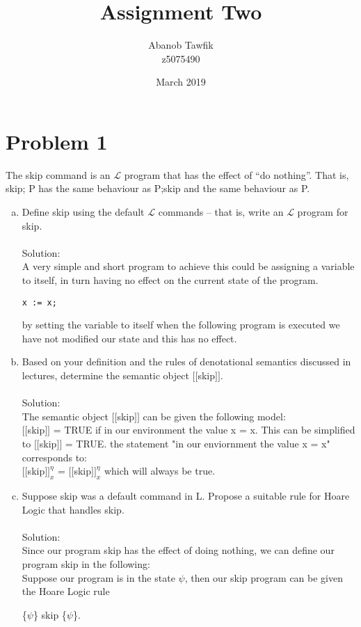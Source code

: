 \documentclass{article}
\title{Assignment Two}
\author{Abanob Tawfik\\z5075490}
\date{March 2019}
\newcommand*\moveToRight[1]{\hspace*{0em plus 1fill}\makebox{(#1)}}
\begin{document}
\maketitle
\section{Problem 1}
The skip command is an $\mathcal{L}$  program that has the effect of “do nothing”. That is, skip; P has the same behaviour as P;skip and the same behaviour as P.
\begin{enumerate}[(a)]
    \item Define skip using the default $\mathcal{L}$ commands – that is, write an $\mathcal{L}$ program for skip. \moveToRight{3 marks}\\\\
    Solution: \\
    A very simple and short program to achieve this could be assigning a variable to itself, in turn having no effect on the current state of the program.
    \begin{lstlisting}[language=Maple,mathescape=true]
x := x;
    \end{lstlisting}
    by setting the variable to itself when the following program is executed we have not modified our state and this has no effect. 
    
    \item Based on your definition and the rules of denotational semantics discussed in lectures, determine the semantic object $[\![$skip$]\!]$. \moveToRight{4 marks}\\\\
    Solution: \\
    The semantic object $[\![$skip$]\!]$ can be given the following model:\\
    $[\![$skip$]\!]$ = TRUE if in our environment the value x = x.
    This can be simplified to $[\![$skip$]\!]$ = TRUE.
    the statement "in our enviornment the value x = x" corresponds to:\\
    $[\![$skip$]\!]^\eta_x$ = $[\![$skip$]\!]^\eta_x$ which will always be true.
    
    
    \item Suppose skip was a default command in L. Propose a suitable rule for Hoare Logic that handles skip. \moveToRight{3 marks}\\\\
    Solution: \\
    Since our program skip has the effect of doing nothing, we can define our program skip in the following:\\
    Suppose our program is in the state $\psi$, then our skip program can be given the Hoare Logic rule
    \begin{center}
        \{$\psi$\} skip \{$\psi$\}.\\
    \end{center}
\end{enumerate}
\end{document}
